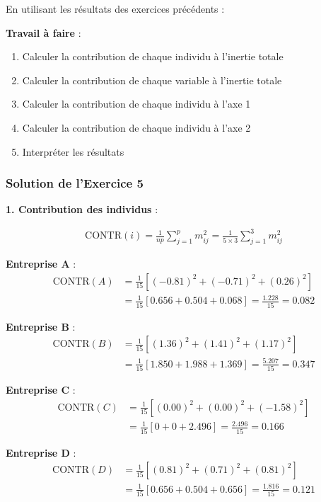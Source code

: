 \documentclass[11pt,a4paper]{article}
\begin{document}
En utilisant les résultats des exercices précédents :

\textbf{Travail à faire} :
\begin{enumerate}
    \item Calculer la contribution de chaque individu à l'inertie totale
    \item Calculer la contribution de chaque variable à l'inertie totale
    \item Calculer la contribution de chaque individu à l'axe 1
    \item Calculer la contribution de chaque individu à l'axe 2
    \item Interpréter les résultats
\end{enumerate}

\subsubsection{Solution de l'Exercice 5}

\textbf{1. Contribution des individus} :

\begin{align*}
\text{CONTR}(i) = \frac{1}{np}\sum_{j=1}^{p} m_{ij}^2 = \frac{1}{5 \times 3}\sum_{j=1}^{3} m_{ij}^2
\end{align*}

\textbf{Entreprise A} :
\begin{align*}
\text{CONTR}(A) &= \frac{1}{15}[(-0.81)^2 + (-0.71)^2 + (0.26)^2] \\
&= \frac{1}{15}[0.656 + 0.504 + 0.068] = \frac{1.228}{15} = 0.082
\end{align*}

\textbf{Entreprise B} :
\begin{align*}
\text{CONTR}(B) &= \frac{1}{15}[(1.36)^2 + (1.41)^2 + (1.17)^2] \\
&= \frac{1}{15}[1.850 + 1.988 + 1.369] = \frac{5.207}{15} = 0.347
\end{align*}

\textbf{Entreprise C} :
\begin{align*}
\text{CONTR}(C) &= \frac{1}{15}[(0.00)^2 + (0.00)^2 + (-1.58)^2] \\
&= \frac{1}{15}[0 + 0 + 2.496] = \frac{2.496}{15} = 0.166
\end{align*}

\textbf{Entreprise D} :
\begin{align*}
\text{CONTR}(D) &= \frac{1}{15}[(0.81)^2 + (0.71)^2 + (0.81)^2] \\
&= \frac{1}{15}[0.656 + 0.504 + 0.656] = \frac{1.816}{15} = 0.121
\end{align*}
\end{document}
